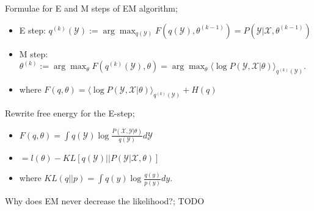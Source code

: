 \documentclass{article}
\begin{document}
Formulae for E and M steps of EM algorithm; \begin{itemize}
	\item E step: $q^(k)(\mathcal{Y}):=\arg\max_{q(\mathcal{Y})}  F(q(\mathcal{Y}),\theta^{(k-1)}) = P(\mathcal{Y}|\mathcal{X},\theta^{(k-1)})$
	\item M step: $\theta^{(k)}:=\arg\max_\theta F(q^(k)(\mathcal{Y}),\theta)=\arg\max_{\theta}\langle \log P(\mathcal{Y}, \mathcal{X}|\theta)\rangle_{q^{(k)}(\mathcal{Y})}$.
	\item where $F(q,\theta)=\langle \log P(\mathcal{Y}, \mathcal{X}|\theta)\rangle_{q^{(k)}(\mathcal{Y})}+H(q)$
\end{itemize}

Rewrite free energy for the E-step; \begin{itemize}
	\item $F(q,\theta) = \int q(\mathcal{Y})\log \frac{P(\mathcal{X, Y}|\theta)}{q(\mathcal{Y})}d\mathcal{Y}$
	\item $= l(\theta) - KL[q(\mathcal{Y})||P(\mathcal{Y}|\mathcal{X},\theta)]$
	\item where $KL(q||p) = \int q(y)\log\frac{q(y)}{p(y)}dy$.
\end{itemize}

Why does EM never decrease the likelihood?; TODO
\end{document}
